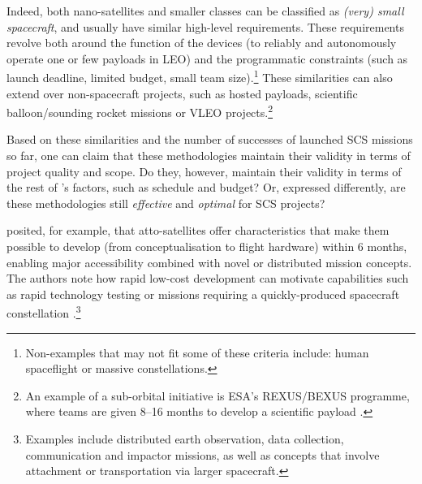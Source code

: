 \documentclass[a4paper,nobib,justified,final]{tufte-book}
\begin{document}
Indeed, both nano-satellites and smaller classes can be classified as \emph{(very) small spacecraft}, and usually have similar high-level requirements. These requirements revolve both around the function of the devices (to reliably and autonomously operate one or few payloads in \acl{LEO}) and the programmatic constraints (such as launch deadline, limited budget, small team size).\footnote{Non-examples that may not fit some of these criteria include: human spaceflight or massive constellations.} These similarities can also extend over non-spacecraft projects, such as hosted payloads, scientific balloon/sounding rocket missions or \acl{VLEO} projects.\footnote{An example of a sub-orbital initiative is \acs{ESA}'s REXUS/BEXUS programme, where teams are given 8--16 months to develop a scientific payload \cite{REXUSBEXUSSchedule}.}

Based on these similarities and the number of successes of launched \acs{SCS} missions so far, one can claim that these methodologies maintain their validity in terms of project quality and scope. Do they, however, maintain their validity in terms of the rest of 's factors, such as schedule and budget? Or, expressed differently, are these methodologies still \emph{effective} and \emph{optimal} for \acs{SCS} projects?

\citeauthor{heinAttoSatsChipSatsOther2019} posited, for example, that atto-satellites offer characteristics that make them possible to develop (from conceptualisation to flight hardware) within 6 months, enabling major accessibility combined with novel or distributed mission concepts. The authors note how rapid low-cost development can motivate capabilities such as rapid technology testing or missions requiring a quickly-produced spacecraft constellation \autocite{heinAttoSatsChipSatsOther2019}.\footnote{Examples include distributed earth observation, data collection, communication and impactor missions, as well as concepts that involve attachment or transportation via larger spacecraft.}
\end{document}
